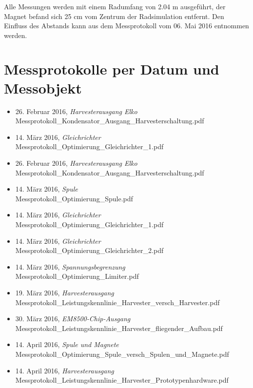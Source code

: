Alle Messungen werden mit einem Radumfang von 2.04 m ausgeführt, der Magnet befand sich 25 cm vom Zentrum der Radsimulation entfernt. Den Einfluss des Abstands kann aus dem Messprotokoll vom 06. Mai 2016 entnommen werden.

\chapter{Messprotokolle per Datum und Messobjekt}
\label{uebersicht_messprotokolle}

\label{tabelle_uebersicht_messprotokolle}
\begin{itemize}
\item 26. Februar 2016, \emph{Harvesterausgang Elko}\\
Messprotokoll\_Kondensator\_Ausgang\_Harvesterschaltung.pdf
\item 14. März 2016, \emph{Gleichrichter}\\
Messprotokoll\_Optimierung\_Gleichrichter\_1.pdf
\item 26. Februar 2016, \emph{Harvesterausgang Elko}\\
Messprotokoll\_Kondensator\_Ausgang\_Harvesterschaltung.pdf
\item 14. März 2016, \emph{Spule}\\
Messprotokoll\_Optimierung\_Spule.pdf
\item 14. März 2016, \emph{Gleichrichter}\\
Messprotokoll\_Optimierung\_Gleichrichter\_1.pdf
\item 14. März 2016, \emph{Gleichrichter}\\
Messprotokoll\_Optimierung\_Gleichrichter\_2.pdf
\item 14. März 2016, \emph{Spannungsbegrenzung}\\
Messprotokoll\_Optimierung\_Limiter.pdf
\item 19. März 2016, \emph{Harvesterausgang}\\
Messprotokoll\_Leistungskennlinie\_Harvester\_versch\_Harvester.pdf
\item 30. März 2016, \emph{EM8500-Chip-Ausgang}\\
Messprotokoll\_Leistungskennlinie\_Harvester\_fliegender\_Aufbau.pdf
\item 14. April 2016, \emph{Spule und Magnete}\\
Messprotokoll\_Optimierung\_Spule\_versch\_Spulen\_und\_Magnete.pdf
\item 14. April 2016, \emph{Harvesterausgang}\\
Messprotokoll\_Leistungskennlinie\_Harvester\_Prototypenhardware.pdf

\end{itemize}
